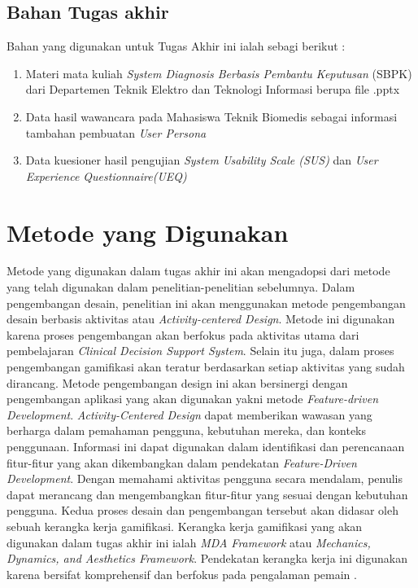 \subsection{Bahan Tugas akhir}
Bahan yang digunakan untuk Tugas Akhir ini ialah sebagi berikut :
\begin{enumerate}
	\item Materi mata kuliah \textit{System Diagnosis Berbasis Pembantu Keputusan} (SBPK) dari Departemen Teknik Elektro dan Teknologi Informasi berupa file .pptx
	\item Data hasil wawancara pada Mahasiswa Teknik Biomedis sebagai informasi tambahan pembuatan \textit{User Persona}
	\item Data kuesioner hasil pengujian \textit{System Usability Scale (SUS)} dan \textit{User Experience Questionnaire(UEQ)}
\end{enumerate}

\section{Metode yang Digunakan}
Metode yang digunakan dalam tugas akhir ini akan mengadopsi dari metode yang telah digunakan dalam penelitian-penelitian sebelumnya.
Dalam pengembangan desain, penelitian ini akan menggunakan metode pengembangan desain berbasis aktivitas atau \textit{Activity-centered Design}.
Metode ini digunakan karena proses pengembangan akan berfokus pada aktivitas utama dari pembelajaran \textit{Clinical Decision Support System}.
Selain itu juga, dalam proses pengembangan gamifikasi akan teratur berdasarkan setiap aktivitas yang sudah dirancang.
Metode pengembangan design ini akan bersinergi dengan pengembangan aplikasi yang akan digunakan yakni metode \textit{Feature-driven Development}.
\textit{Activity-Centered Design} dapat memberikan wawasan yang berharga dalam pemahaman pengguna, kebutuhan mereka, dan konteks penggunaan. 
Informasi ini dapat digunakan dalam identifikasi dan perencanaan fitur-fitur yang akan dikembangkan dalam pendekatan \textit{Feature-Driven Development}. 
Dengan memahami aktivitas pengguna secara mendalam, penulis dapat merancang dan mengembangkan fitur-fitur yang sesuai dengan kebutuhan pengguna.
Kedua proses desain dan pengembangan tersebut akan didasar oleh sebuah kerangka kerja gamifikasi. 
Kerangka kerja gamifikasi yang akan digunakan dalam tugas akhir ini ialah \textit{MDA Framework} atau \textit{Mechanics, Dynamics, and Aesthetics Framework}.
Pendekatan kerangka kerja ini digunakan karena bersifat komprehensif dan berfokus pada pengalaman pemain \cite{marisa2020gamifikasi}.

